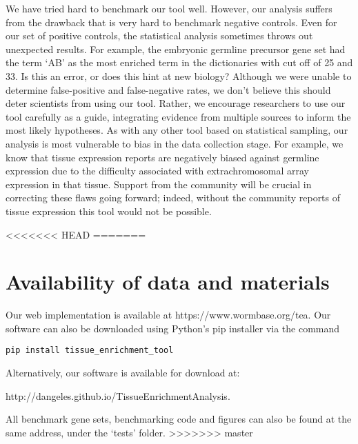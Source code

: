 \documentclass[linenumbers, doublespacing]{bmcart}
\begin{document}
We have tried hard to benchmark our tool well. However, our analysis suffers from the drawback that is very hard to benchmark negative controls. Even for our set of positive controls, the statistical analysis sometimes throws out unexpected results. For example, the embryonic germline precursor gene set had the term `AB' as the most enriched term in the dictionaries with cut off of 25 and 33. Is this an error, or does this hint at new biology? Although we were unable to determine false-positive and false-negative rates, we don't believe this should deter scientists from using our tool. Rather, we encourage researchers to use our tool carefully as a guide, integrating evidence from multiple sources to inform the most likely hypotheses. As with any other tool based on statistical sampling, our analysis is most vulnerable to bias in the data collection stage. For example, we know that tissue expression reports are negatively biased against germline expression due to the difficulty associated with extrachromosomal array expression in that tissue. Support from the community will be crucial in correcting these flaws going forward; indeed, without the community reports of tissue expression this tool would not be possible. 

<<<<<<< HEAD
=======
\section*{Availability of data and materials}
Our web implementation is available at https://www.wormbase.org/tea. Our software can also be downloaded using Python's pip installer via the command 

\texttt{pip install tissue\_enrichment\_tool}

Alternatively, our software is available for download at:

http://dangeles.github.io/TissueEnrichmentAnalysis. 

All benchmark gene sets, benchmarking code and figures can also be found at the same address, under the `tests' folder. 
>>>>>>> master

\end{document}
